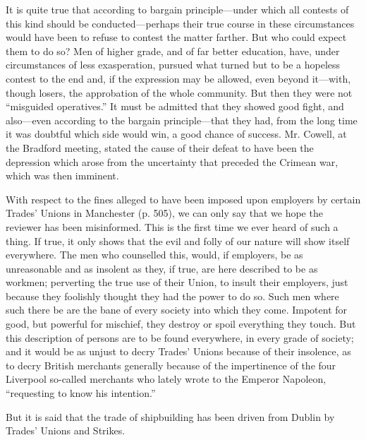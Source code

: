 It is quite true that according to bargain principle---under which all
contests of this kind should be conducted---perhaps their true course in
these circumstances would have been to refuse to contest the matter
farther. But who could expect them to do so? Men of higher grade, and of
far better education, have, under circumstances of less exasperation,
pursued what turned but to be a hopeless contest to the end and, if the
expression may be allowed, even beyond it---with, though losers, the
approbation of the whole community. But then they were not ``misguided
operatives.'' It must be admitted that they showed good fight, and
also---even according to the bargain principle---that they had, from the
long time it was doubtful which side would win, a good chance of
success. Mr. Cowell, at the Bradford meeting, stated the cause of their
defeat to have been the depression which arose from the uncertainty that
preceded the Crimean war, which was then imminent.

With respect to the fines alleged to have been imposed upon employers by
certain Trades' Unions in Manchester (p. 505), we can only say that we
hope the reviewer has been misinformed. This is the first time we ever
heard of such a thing. If true, it only shows that the evil and folly of
our nature will show itself everywhere. The men who counselled this,
would, if employers, be as unreasonable and as insolent as they, if
true, are here described to be as workmen; perverting the true use of
their Union, to insult their employers, just because they foolishly
thought they had the power to do so. Such men where such there be are
the bane of every society into which they come. Impotent for good, but
powerful for mischief, they destroy or spoil everything they touch. But
this description of persons are to be found everywhere, in every grade
of society; and it would be as unjust to decry Trades' Unions because of
their insolence, as to decry British merchants generally because of the
impertinence of the four Liverpool so-called merchants who lately wrote
to the Emperor Napoleon, ``requesting to know his intention.''

But it is said that the trade of shipbuilding has been driven from
Dublin by Trades' Unions and Strikes.

